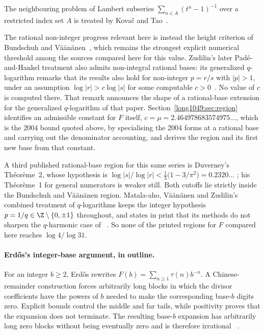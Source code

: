 \documentclass[11pt]{article}
\begin{document}
The neighbouring problem of Lambert
subseries $\sum_{n\in A}(t^{n}-1)^{-1}$ over a restricted index set $A$ is
treated by Kova\v{c} and Tao~\cite{kovactao2024}.

The rational non-integer
progress relevant here is instead the height criterion of Bundschuh and
V\"a\"an\"anen~\cite{bv1994}, which remains the strongest explicit numerical
threshold among the sources compared here for this value.  Zudilin's later
Pad\'e-and-Hankel treatment also admits non-integral rational bases: its
generalized $q$-logarithm remarks that its results also hold for non-integer
$p=r/s$ with $|p|>1$, under an assumption $\log|r|>c\log|s|$ for some computable
$c>0$~\cite{zudilin2016}.  No value of $c$ is computed there.  That remark
announces the shape of a rational-base extension for the generalized
$q$-logarithm of that paper.  Section~\ref{long1049:sec:region} identifies an admissible
constant for $F$ itself, $c=\mu=2.464978683574975\ldots$, which is the 2004
bound quoted above, by specialising the 2004 forms at a rational base and
carrying out the denominator accounting, and derives the region and its first
new base from that constant.

A third published rational-base region for this same series is Duverney's
Th\'eor\`eme~2, whose hypothesis is
$\log|s|/\log|r|<\frac13\bigl(1-3/\pi^{2}\bigr)=0.2320\ldots$
\cite[Th\'eor\`eme~2, p.~174]{duverney1996}; his Th\'eor\`eme~1 for general
numerators is weaker still.  Both cutoffs lie strictly inside the Bundschuh and
V\"a\"an\"anen region.  Matala-aho, V\"a\"an\"anen and Zudilin's combined
treatment of $q$-logarithms keeps the integer hypothesis $p=1/q\in\Z\mathbin{\backslash}\{0,\pm1\}$
throughout, and states in print that its methods do not sharpen the
$q$-harmonic case of~\cite{zudilin2004}
\cite[abstract p.~879; introduction p.~880]{matalaaho2006}.  So none of the
printed regions for $F$ compared here reaches $\log4/\log31$.

\paragraph{Erd\H{o}s's integer-base argument, in outline.}
For an integer $b\ge2$, Erd\H{o}s rewrites
$F(b)=\sum_{n\ge1}\tau(n)b^{-n}$.  A Chinese-remainder construction forces
arbitrarily long blocks in which the divisor coefficients have the powers of
$b$ needed to make the corresponding base-$b$ digits zero.  Explicit bounds
control the middle and far tails, while positivity proves that the expansion
does not terminate.  The resulting base-$b$ expansion has arbitrarily long
zero blocks without being eventually zero and is therefore irrational
~\cite[pp.~63--66]{erdos1948}.
\end{document}
